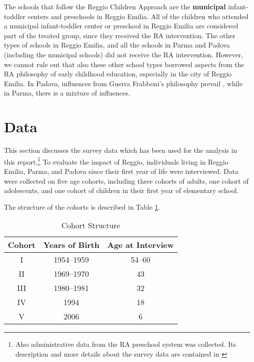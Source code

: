 \documentclass[12pt]{article}
\begin{document}
The schools that follow the Reggio Children Approach are the \textbf{municipal} infant-toddler centers and preschools in Reggio Emilia. All of the children who attended a municipal infant-toddler center or preschool in Reggio Emilia are considered part of the treated group, since they received the RA intervention. The other types of schools in Reggio Emilia, and all the schools in Parma and Padova (including the municipal schools) did not receive the RA intervention. However, we cannot rule out that also these other school types borrowed aspects from the RA philosophy of early childhood education, especially in the city of Reggio Emilia. 
In Padova, influences from Guerra Frabboni's philosophy prevail \citep{Frabboni1999}, while in Parma, there is a mixture of influences.

%
\section{Data}
\label{sec:data}

This section discusses the survey data which has been used for the analysis in this report.\footnote{Also administrative data from the RA preschool system was collected. Its description and more details about the survey data are contained in \citet{biroli2015evaluating}} To evaluate the impact of Reggio, individuals living in Reggio Emilia, Parma, and Padova since their first year of life were interviewed. Data were collected on five age cohorts, including three cohorts of adults, one cohort of adolescents, and one cohort of children in their first year of elementary school. 

The structure of the cohorts is described in Table \ref{tab:cohorts}.

\begin{table}[htbp]
\begin{center}
\caption{Cohort Structure}\label{tab:cohorts}
\begin{tabular}{ccc}
\hline \hline
Cohort & Years of Birth & Age at Interview \\
\hline
I & 1954--1959 & 54--60 \\
II & 1969--1970 & 43 \\
III & 1980--1981 & 32 \\
IV & 1994 & 18 \\
V & 2006 & 6 \\
\hline  
\end{tabular}
\end{center}
\end{table}
\end{document}
